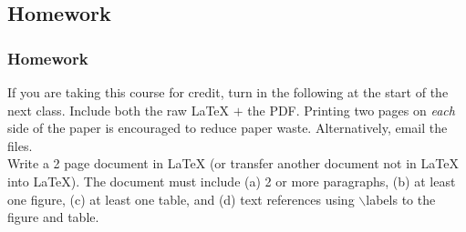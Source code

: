 \documentclass[slidestop,compress,mathserif]{beamer}
\begin{document}
\subsection[Homework]{Homework}
\begin{frame}
		\frametitle{Homework}
		
	If you are taking this course for credit, turn in the following at the start of the next class. Include both the raw LaTeX $+$ the PDF. Printing two pages on \emph{each} side of the paper is encouraged to reduce paper waste. Alternatively, email the files. \\[5mm]

	Write a 2 page document in LaTeX (or transfer another document not in LaTeX into LaTeX). The document must include (a) 2 or more paragraphs, (b) at least one figure, (c) at least one table, and (d) text references using {\color{command}$\backslash$label}s to the figure and table.
	
\end{frame}
\end{document}
